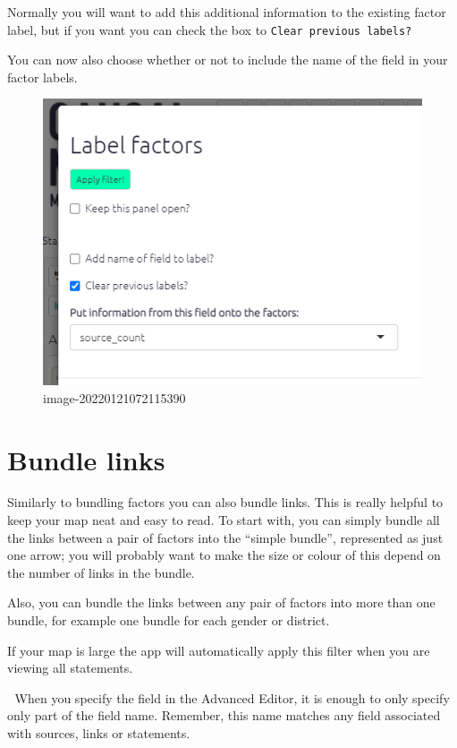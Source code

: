 \documentclass[
]{book}
\begin{document}
Normally you will want to add this additional information to the existing factor label, but if you want you can check the box to \texttt{Clear\ previous\ labels?}

You can now also choose whether or not to include the name of the field in your factor labels.

\begin{figure}
\centering
\includegraphics{_assets/image-20220121072115390.png}
\caption{image-20220121072115390}
\end{figure}

\hypertarget{bundlelinks}{%
\section{Bundle links}\label{bundlelinks}}

Similarly to bundling factors you can also bundle links. This is really helpful to keep your map neat and easy to read. To start with, you can simply bundle all the links between a pair of factors into the ``simple bundle'', represented as just one arrow; you will probably want to make the size or colour of this depend on the number of links in the bundle.

Also, you can bundle the links between any pair of factors into more than one bundle, for example one bundle for each gender or district.

If your map is large the app will automatically apply this filter when you are viewing all statements.

🧪 When you specify the field in the Advanced Editor, it is enough to only specify only part of the field name. Remember, this name matches any field associated with sources, links or statements.
\end{document}
